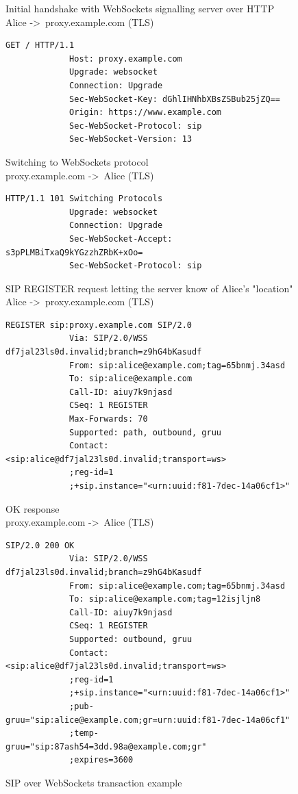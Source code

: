 \documentclass[]{report}
\begin{document}
			\begin{figure}[h!]
			\caption{SIP over WebSockets transaction example\cite{SIP Over WebSockets}}
			 Initial handshake with WebSockets signalling server over HTTP \\
			 Alice -\textgreater\ proxy.example.com (TLS)
			 \begin{lstlisting}[tabsize=1,frame=single, basicstyle=\ttfamily\footnotesize]
			 GET / HTTP/1.1
			 Host: proxy.example.com
			 Upgrade: websocket
			 Connection: Upgrade
			 Sec-WebSocket-Key: dGhlIHNhbXBsZSBub25jZQ==
			 Origin: https://www.example.com
			 Sec-WebSocket-Protocol: sip
			 Sec-WebSocket-Version: 13
			 \end{lstlisting}
			 Switching to WebSockets protocol \\
			 proxy.example.com -\textgreater\ Alice (TLS)
			 \begin{lstlisting}[tabsize=1,frame=single, basicstyle=\ttfamily\footnotesize]
			 HTTP/1.1 101 Switching Protocols
			 Upgrade: websocket
			 Connection: Upgrade
			 Sec-WebSocket-Accept: s3pPLMBiTxaQ9kYGzzhZRbK+xOo=
			 Sec-WebSocket-Protocol: sip
			 \end{lstlisting}
			 SIP REGISTER request letting the server know of Alice's "location" \\
			 Alice -\textgreater\ proxy.example.com (TLS)
			 \begin{lstlisting}[tabsize=1,frame=single, basicstyle=\ttfamily\footnotesize]
			 REGISTER sip:proxy.example.com SIP/2.0
			 Via: SIP/2.0/WSS df7jal23ls0d.invalid;branch=z9hG4bKasudf
			 From: sip:alice@example.com;tag=65bnmj.34asd
			 To: sip:alice@example.com
			 Call-ID: aiuy7k9njasd
			 CSeq: 1 REGISTER
			 Max-Forwards: 70
			 Supported: path, outbound, gruu
			 Contact: <sip:alice@df7jal23ls0d.invalid;transport=ws>
			 ;reg-id=1
			 ;+sip.instance="<urn:uuid:f81-7dec-14a06cf1>"
			 \end{lstlisting}
			 OK response \\
			 proxy.example.com -\textgreater\ Alice (TLS)
			 \begin{lstlisting}[tabsize=1,frame=single, basicstyle=\ttfamily\footnotesize]
			 SIP/2.0 200 OK
			 Via: SIP/2.0/WSS df7jal23ls0d.invalid;branch=z9hG4bKasudf
			 From: sip:alice@example.com;tag=65bnmj.34asd
			 To: sip:alice@example.com;tag=12isjljn8
			 Call-ID: aiuy7k9njasd
			 CSeq: 1 REGISTER
			 Supported: outbound, gruu
			 Contact: <sip:alice@df7jal23ls0d.invalid;transport=ws>
			 ;reg-id=1
			 ;+sip.instance="<urn:uuid:f81-7dec-14a06cf1>"
			 ;pub-gruu="sip:alice@example.com;gr=urn:uuid:f81-7dec-14a06cf1"
			 ;temp-gruu="sip:87ash54=3dd.98a@example.com;gr"
			 ;expires=3600
			 \end{lstlisting}
			 \end{figure}
			 
\end{document}
